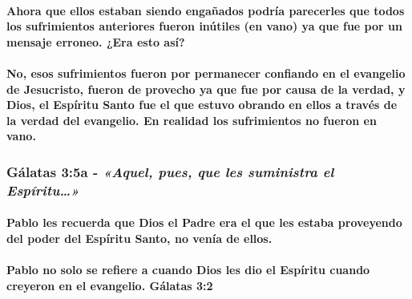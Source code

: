 \documentclass[11a pt,twoside]{article}
\newcommand{\scripture}[1]{%
  {\fontsize{12pt}{16pt}\selectfont\ScriptureFont\itshape #1}%
}
\let\oldsubsubsection\subsubsection
\renewcommand{\subsubsection}{\needspace{4\baselineskip}\oldsubsubsection}
\let\oldparagraph\paragraph
\renewcommand{\paragraph}{\needspace{3\baselineskip}\oldparagraph}
\begin{document}
\paragraph{Ahora que ellos estaban siendo engañados podría parecerles
que todos los sufrimientos anteriores fueron inútiles (en vano) ya que
fue por un mensaje erroneo. ¿Era esto
así?}\label{ahora-que-ellos-estaban-siendo-engauxf1ados-podruxeda-parecerles-que-todos-los-sufrimientos-anteriores-fueron-inuxfatiles-en-vano-ya-que-fue-por-un-mensaje-erroneo.-era-esto-asuxed}

\paragraph{No, esos sufrimientos fueron por permanecer confiando en el
evangelio de Jesucristo, fueron de provecho ya que fue por causa de la
verdad, y Dios, el Espíritu Santo fue el que estuvo obrando en ellos a
través de la verdad del evangelio. En realidad los sufrimientos no
fueron en
vano.}\label{no-esos-sufrimientos-fueron-por-permanecer-confiando-en-el-evangelio-de-jesucristo-fueron-de-provecho-ya-que-fue-por-causa-de-la-verdad-y-dios-el-espuxedritu-santo-fue-el-que-estuvo-obrando-en-ellos-a-travuxe9s-de-la-verdad-del-evangelio.-en-realidad-los-sufrimientos-no-fueron-en-vano.}

\subsubsection{\texorpdfstring{Gálatas 3:5a -
\scripture{«Aquel, pues, que les suministra el Espíritu…»}}{Gálatas 3:5a - }}\label{guxe1latas-35a---aquel-pues-que-les-suministra-el-espuxedritu}

\paragraph{Pablo les recuerda que Dios el Padre era el que les estaba
proveyendo del poder del Espíritu Santo, no venía de
ellos.}\label{pablo-les-recuerda-que-dios-el-padre-era-el-que-les-estaba-proveyendo-del-poder-del-espuxedritu-santo-no-venuxeda-de-ellos.}

\paragraph{Pablo no solo se refiere a cuando Dios les dio el Espíritu
cuando creyeron en el evangelio. Gálatas
3:2}\label{pablo-no-solo-se-refiere-a-cuando-dios-les-dio-el-espuxedritu-cuando-creyeron-en-el-evangelio.-guxe1latas-32}
\end{document}

